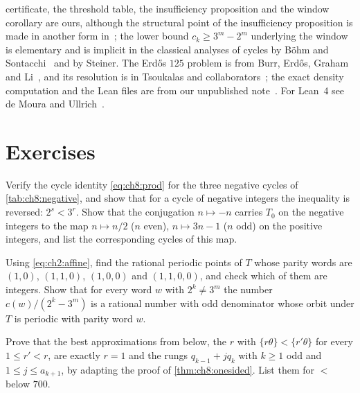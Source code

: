 certificate, the threshold table, the insufficiency proposition and the window
corollary are ours, although the structural point of the insufficiency proposition is made in another form in~\cite[\S5]{halbeisen1997}; the lower bound
$c_k\geq3^m-2^m$ underlying the window is elementary and is implicit in the
classical analyses of cycles by B\"ohm and Sontacchi~\cite{bohm1978} and by Steiner. The Erd\H{o}s $125$ problem is from Burr, Erd\H{o}s, Graham
and Li~\cite{burr1996}, and its resolution is in Tsoukalas and
collaborators~\cite{tsoukalas2026}; the exact density computation and the Lean
files are from our unpublished note~\cite{polsonsokolov2026nexus}. For Lean~4 see de Moura
and Ullrich~\cite{moura2021}.

\section*{Exercises}

\begin{exercise}
Verify the cycle identity \eqref{eq:ch8:prod} for the three negative cycles of
\cref{tab:ch8:negative}, and show that for a cycle of negative integers the
inequality is reversed: $2^s<3^r$. Show that the conjugation $n\mapsto-n$
carries $T_0$ on the negative integers to the map $n\mapsto n/2$ ($n$ even),
$n\mapsto3n-1$ ($n$ odd) on the positive integers, and list the corresponding
cycles of this map.
\end{exercise}

\begin{exercise}
Using \eqref{eq:ch2:affine}, find the rational periodic points of $T$ whose
parity words are $(1,0)$, $(1,1,0)$, $(1,0,0)$ and $(1,1,0,0)$, and check
which of them are integers. Show that for every word $w$ with $2^k\neq3^m$ the
number $c(w)/(2^k-3^m)$ is a rational number with odd denominator whose orbit
under $T$ is periodic with parity word $w$.
\end{exercise}

\begin{exercise}
Prove that the best approximations from below, the $r$ with
$\{r\theta\}<\{r'\theta\}$ for every $1\leq r'<r$, are exactly $r=1$ and the rungs
$q_{k-1}+jq_k$ with $k\geq1$ odd and $1\leq j\leq a_{k+1}$, by adapting the proof
of \cref{thm:ch8:onesided}. List them for $\lt$ below $700$.
\end{exercise}

